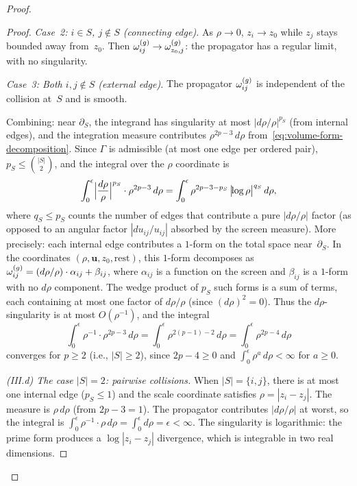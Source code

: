 \begin{proof}
\begin{proof}
\smallskip
\noindent\emph{Case~2: $i \in S$, $j \notin S$ (connecting edge).}
As $\rho \to 0$, $z_i \to z_0$ while $z_j$ stays bounded away
from~$z_0$. Then
$\omega^{(g)}_{ij} \to \omega^{(g)}_{z_0, j}$: the propagator has a
regular limit, with no singularity.

\smallskip
\noindent\emph{Case~3: Both $i, j \notin S$ (external edge).}
The propagator $\omega^{(g)}_{ij}$ is independent of the collision
at~$S$ and is smooth.

\smallskip
Combining: near $\partial_S$, the integrand has singularity
at most $|d\rho/\rho|^{p_S}$ (from internal edges), and the
integration measure contributes
$\rho^{2p-3}\, d\rho$ from~\eqref{eq:volume-form-decomposition}.
Since $\Gamma$ is admissible (at most one edge per ordered pair),
$p_S \le \binom{|S|}{2}$, and the integral over the $\rho$
coordinate is
\begin{equation}\label{eq:rho-convergence-estimate}
 \int_0^{\epsilon}
 \Bigl|\frac{d\rho}{\rho}\Bigr|^{p_S}
 \cdot \rho^{2p-3}\, d\rho
 = \int_0^{\epsilon}
 \rho^{2p - 3 - p_S}\,
 \bigl|\!\log\rho\bigr|^{q_S}\, d\rho,
\end{equation}
where $q_S \le p_S$ counts the number of edges that contribute a
pure $|d\rho/\rho|$ factor (as opposed to an angular factor
$|du_{ij}/u_{ij}|$ absorbed by the screen measure).
More precisely: each internal edge contributes a $1$-form on the
total space near~$\partial_S$. In the coordinates
$(\rho, \mathbf{u}, z_0, \text{rest})$, this $1$-form
decomposes as $\omega^{(g)}_{ij} = (d\rho/\rho) \cdot \alpha_{ij}
+ \beta_{ij}$, where $\alpha_{ij}$ is a function on the screen
and $\beta_{ij}$ is a $1$-form with no $d\rho$ component. The
wedge product of $p_S$ such forms is a sum of terms, each
containing at most one factor of $d\rho/\rho$ (since
$(d\rho)^2 = 0$). Thus the $d\rho$-singularity is at most
$O(\rho^{-1})$, and the integral
\[
 \int_0^{\epsilon} \rho^{-1} \cdot \rho^{2p-3}\, d\rho
 = \int_0^{\epsilon} \rho^{2(p-1) - 2}\, d\rho
 = \int_0^{\epsilon} \rho^{2p - 4}\, d\rho
\]
converges for $p \ge 2$ (i.e., $|S| \ge 2$), since
$2p - 4 \ge 0$ and $\int_0^\epsilon \rho^a\, d\rho < \infty$
for $a \ge 0$.

\medskip\noindent
\emph{(III.d) The case $|S| = 2$: pairwise collisions.}
When $|S| = \{i, j\}$, there is at most one internal edge
($p_S \le 1$) and the scale coordinate satisfies
$\rho = |z_i - z_j|$. The measure is $\rho\, d\rho$
(from $2p - 3 = 1$). The propagator contributes
$|d\rho/\rho|$ at worst, so the integral is
$\int_0^\epsilon \rho^{-1} \cdot \rho\, d\rho
= \int_0^\epsilon d\rho = \epsilon < \infty$.
The singularity is logarithmic: the prime form produces
a $\log|z_i - z_j|$ divergence, which is integrable in two
real dimensions.


\end{proof}
\end{proof}
